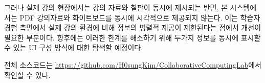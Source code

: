 \documentclass[pdflatex,sn-mathphys-num]{sn-jnl}%
\theoremstyle{thmstyleone}%
\theoremstyle{thmstyletwo}%
\theoremstyle{thmstylethree}%
\begin{document}
그러나 실제 강의 현장에서는 강의 자료와 칠판이 동시에 제시되는 반면, 본 시스템에서는 PDF 강의자료와 화이트보드를 동시에 시각적으로 제공되지 않는다. 이는 학습자 경험 측면에서 실제 강의 환경에 비해 정보의 병렬적 제공이 제한된다는 점에서 개선이 필요한 부분이다. 향후에는 이러한 한계를 해소하기 위해 두가지 정보를 동시에 표시할 수 있는 UI 구성 방식에 대한 탐색할 예정이다.

전체 소스코드는 \url{https://github.com/H0sungKim/CollaborativeComputingLab}에서 확인할 수 있다.



\end{document}
